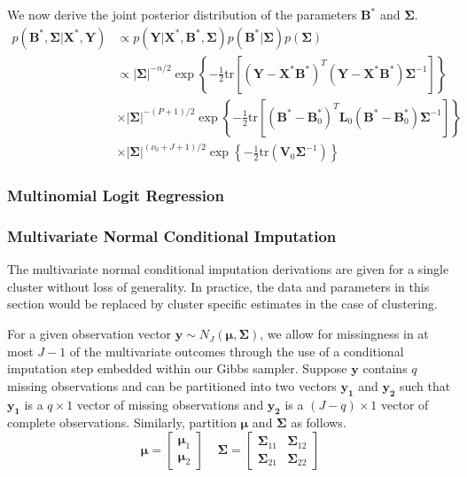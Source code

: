 \documentclass{article}
\newcommand{\tr}{\mbox{tr}}
\begin{document}
We now derive the joint posterior distribution of the parameters $\mathbf{B}^*$ and $\boldsymbol\Sigma$.
\begin{align*} 
p(\mathbf{B}^*,\boldsymbol\Sigma|\mathbf{X}^*,\mathbf{Y}) & \propto  p(\mathbf{Y}|\mathbf{X}^*,\mathbf{B}^*,\boldsymbol\Sigma)p(\mathbf{B}^*|\boldsymbol\Sigma)p(\boldsymbol\Sigma)\\
&  \propto |\boldsymbol\Sigma|^{-n/2}\exp \left \{ -\frac{1}{2} \tr \left [(\mathbf{Y} - \mathbf{X^*}\mathbf{B}^*)^T(\mathbf{Y} - \mathbf{X^*}\mathbf{B}^*)\boldsymbol\Sigma^{-1} \right ]\right \} \\
& \times |\boldsymbol\Sigma|^{-(P+1)/2} \exp \left \{ -\frac{1}{2} \tr \left [(\mathbf{B}^* - \mathbf{B}^*_0)^T \mathbf{L}_0(\mathbf{B}^* - \mathbf{B}^*_0)\boldsymbol\Sigma^{-1} \right ]\right \} \\
& \times |\boldsymbol\Sigma|^{(\nu_0 + J + 1)/2} \exp \left \{ -\frac{1}{2} \tr (\mathbf{V}_0 \boldsymbol\Sigma^{-1}) \right \}
\end{align*}

\subsubsection*{Multinomial Logit Regression}

\subsubsection*{Multivariate Normal Conditional Imputation}

The multivariate normal conditional imputation derivations are given for a single cluster without loss of generality. In practice, the data and parameters in this section would be replaced by cluster specific estimates in the case of clustering. 

For a given observation vector $\mathbf{y} \sim N_J(\boldsymbol\mu, \boldsymbol\Sigma)$, we allow for missingness in at most $J - 1$ of the multivariate outcomes through the use of a conditional imputation step embedded within our Gibbs sampler. Suppose $\mathbf{y}$ contains $q$ missing observations and can be partitioned into two vectors $\mathbf{y_{1}}$ and $\mathbf{y_{2}}$ such that $\mathbf{y_{1}}$ is a $q \times 1$ vector of missing observations and $\mathbf{y_{2}}$ is a $(J-q) \times 1$ vector of complete observations. Similarly, partition $\boldsymbol\mu$ and $\boldsymbol\Sigma$ as follows.
$$\boldsymbol\mu = \begin{bmatrix} \boldsymbol\mu_1 \\ \boldsymbol\mu_2 \end{bmatrix} \ \ \ \ \ \boldsymbol\Sigma = \begin{bmatrix} \boldsymbol\Sigma_{11} & \boldsymbol\Sigma_{12} \\ \boldsymbol\Sigma_{21} & \boldsymbol\Sigma_{22} \end{bmatrix}$$
\end{document}
